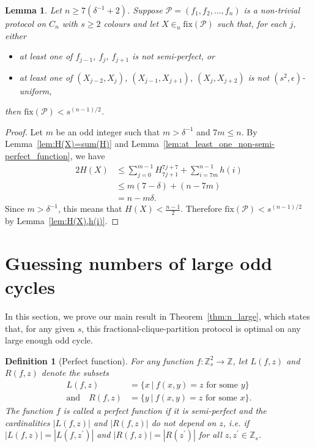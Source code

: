 \documentclass{birkjour}
\newtheorem{lem}[thm]{Lemma}
\theoremstyle{indenteddefinition}
\newtheorem{defn}[thm]{Definition}
\theoremstyle{indenteddefinition}
\numberwithin{equation}{section}
\renewcommand{\Pr}{\mathcal{P}}
\newcommand{\Z}{\mathbb{Z}}
\newcommand{\fix}{\mbox{fix}}
\begin{document}
\begin{lem}
\label{lem:many_non-semi-perfect_functions}
Let $n \geq 7(\delta^{-1}+2)$. Suppose $\Pr = (f_1,f_2, \ldots ,f_n)$ is a non-trivial protocol on $C_n$ with $s \geq 2$ colours and let $X\in_u \fix(\Pr)$ such that, for each $j$, either
	\begin{itemize}
	\item at least one of $f_{j-1}$, $f_j$, $f_{j+1}$ is not semi-perfect, or 
	\item at least one of $(X_{j-2},X_j)$, $(X_{j-1},X_{j+1})$, $(X_j,X_{j+2})$ is not $(s^2,\epsilon)$-uniform,
	\end{itemize}
	  then $\fix(\Pr) < s^{(n-1)/2}$. 
\end{lem}
\begin{proof}
Let $m$ be an odd integer such that $m > \delta^{-1}$ and $7m \leq n$. By Lemma~\ref{lem:H(X)=sum(H)} and Lemma~\ref{lem:at_least_one_non-semi-perfect_function}, we have
	\begin{align*} 2H(X) 
	& \leq \sum_{j=0}^{m-1} H_{7j+1}^{7j+7} + \sum_{i=7m}^{n-1} h(i) \\
	& \leq m(7 - \delta) + (n-7m) \\
	& = n - m \delta.
	\end{align*}
Since $m > \delta^{-1}$, this means that $H(X) < \frac{n-1}{2}$. Therefore $\fix(\Pr) < s^{(n-1)/2}$ by Lemma~\ref{lem:H(X),h(i)}.
\end{proof}









\section{Guessing numbers of large odd cycles}
\label{sec:n_large}






In this section, we prove our main result in Theorem~\ref{thm:n_large}, which states that, for any given $s$, this fractional-clique-partition protocol is optimal on any large enough odd cycle.
\begin{defn}[Perfect function]
\label{defn:perfect_function}
For any function $f: \Z_s^2 \to \Z$, let $L(f,z)$ and $R(f,z)$ denote the subsets 
	\begin{align*} 
	L(f,z) & = \{ x \: | \: f(x,y)=z \mbox{ for some } y \} \\ \mbox{and} \quad  
	R(f,z) & = \{ y \: | \: f(x,y)=z \mbox{ for some } x \}.
	\end{align*}	
The function $f$ is called a \emph{perfect} function if it is semi-perfect and the cardinalities $|L(f,z)|$ and $|R(f,z)|$ do not depend on $z$, 
\emph{i.e.} if $|L(f,z)|=|L(f,z^\prime)|$ and $|R(f,z)|=|R(z^\prime)|$ for all $z,z^\prime \in \Z_s$.
\end{defn}
\end{document}
